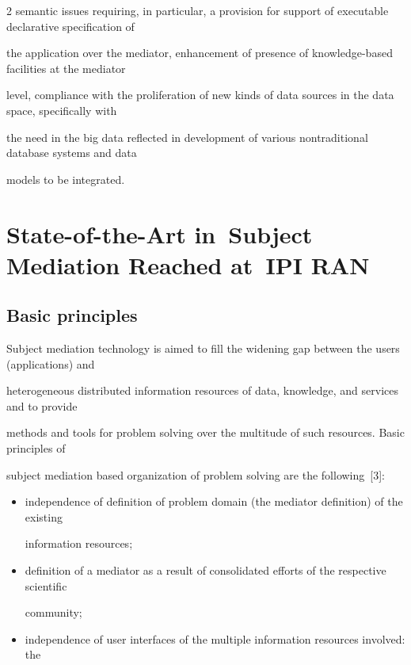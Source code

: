 \begin{multicols}{2}
semantic issues requiring, in particular, a provision for support of executable declarative specification of 

the application over the mediator, enhancement of presence of knowledge-based facilities at the mediator 

level, compliance with the proliferation of new kinds of data sources in the data space, specifically with 

the need in the big data reflected in development of various nontraditional database systems and data 

models to be integrated.



\section{State-of-the-Art in~Subject Mediation Reached at~IPI RAN}



\subsection{Basic principles}



\noindent

Subject mediation technology is aimed to fill the widening gap between the users (applications) and 

heterogeneous distributed information resources of data, knowledge, and services and to provide 

methods and tools for problem solving over the multitude of such resources. Basic principles of 

subject mediation based organization of problem solving are the following~[3]:

\begin{itemize}

\item independence of definition of problem domain (the mediator definition) of the existing 

information resources;\\[-9pt]

\item definition of a mediator as a result of consolidated efforts of the respective scientific 

community;\\[-9pt] 

\item independence of user interfaces of the multiple information resources involved: the 


\end{itemize}
\end{multicols}
